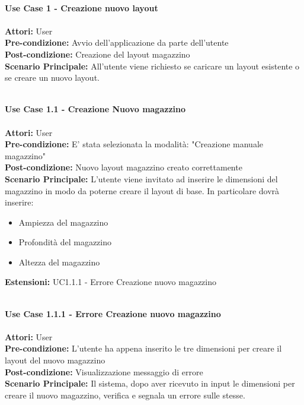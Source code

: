 \Large\textbf{}\\
\Large\textbf{Use Case 1 - Creazione nuovo layout} \\
\vspace{0.5cm}
\large\textbf{} \\
\textbf{Attori:} User\\
\textbf{Pre-condizione:} Avvio dell'applicazione da parte dell'utente\\
\textbf{Post-condizione: } Creazione del layout magazzino\\
\textbf{Scenario Principale:}  All'utente viene richiesto se caricare un layout esistente o se creare un nuovo layout.\\
\vspace{0.5cm}

\Large\textbf{}\\
\Large\textbf{Use Case 1.1 - Creazione Nuovo magazzino} \\
\vspace{0.5cm}
\large\textbf{} \\
\textbf{Attori:} User\\
\textbf{Pre-condizione:} E' stata selezionata la modalità: "Creazione manuale magazzino" \\
\textbf{Post-condizione: } Nuovo layout magazzino creato correttamente\\
\textbf{Scenario Principale:}  L'utente viene invitato ad inserire le dimensioni del magazzino in modo da poterne creare il layout di base. In particolare dovrà inserire:
    \begin{itemize}
        \item Ampiezza del magazzino
        \item Profondità del magazzino 
        \item Altezza del magazzino 
    \end{itemize}
\textbf{Estensioni: } UC1.1.1 - Errore Creazione nuovo magazzino\\
\vspace{0.5cm}

\Large\textbf{}\\
\Large\textbf{Use Case 1.1.1 - Errore Creazione nuovo magazzino} \\
\vspace{0.5cm}
\large\textbf{} \\
\textbf{Attori:} User\\
\textbf{Pre-condizione:} L'utente ha appena inserito le tre dimensioni per creare il layout del nuovo magazzino \\
\textbf{Post-condizione: } Visualizzazione messaggio di errore\\
\textbf{Scenario Principale:}  Il sistema, dopo aver ricevuto in input le dimensioni per creare il nuovo magazzino, verifica e segnala un errore sulle stesse.\\ 
\vspace{0.5cm}

